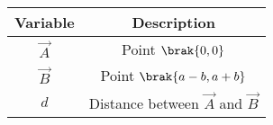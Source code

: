 \begin{tabular}{|c|c|}
\hline
\textbf{Variable} & \textbf{Description} \\
\hline
$\vec{A}$ & Point $\brak{0,0}$ \\
\hline
$\vec{B}$ & Point $\brak{a-b,a+b}$ \\
\hline
$d$ & Distance between $\vec{A}$ and $\vec{B}$ \\
\hline
\end{tabular}
